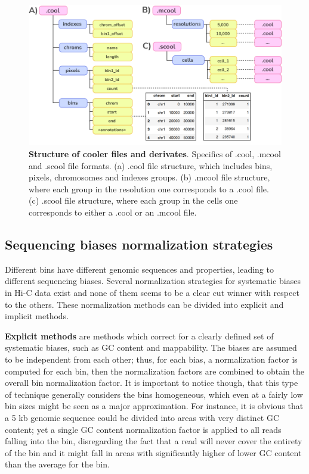 \begin{figure}
  \centering
  \includegraphics[width=1\textwidth]{cooler_format.png}
  \caption{\textbf{Structure of cooler files and derivates}. Specifics of .cool, .mcool and .scool file formats. (a) .cool file structure, which includes bins, pixels, chromosomes and indexes groups. (b) .mcool file structure, where each group in the resolution one corresponds to a .cool file. (c) .scool file structure, where each group in the cells one corresponds to either a .cool or an .mcool file.}
  \label{fig:cooler}
\end{figure}

\subsection{Sequencing biases normalization strategies}\label{par:sequencingbias}

Different bins have different genomic sequences and properties, leading to different sequencing biases. Several normalization strategies for systematic biases in Hi-C data exist and none of them seems to be a clear cut winner with respect to the others\cite{normalization2020}. These normalization methods can be divided into explicit and implicit methods. 

\textbf{Explicit methods} are methods which correct for a clearly defined set of systematic biases, such as GC content and mappability. The biases are assumed to be independent from each other; thus, for each bias, a normalization factor is computed for each bin, then the normalization factors are combined to obtain the overall bin normalization factor. It is important to notice though, that this type of technique generally considers the bins homogeneous, which even at a fairly low bin sizes might be seen as a major approximation. For instance, it is obvious that a 5 kb genomic sequence could be divided into areas with very distinct GC content; yet a single GC content normalization factor is applied to all reads falling into the bin, disregarding the fact that a read will never cover the entirety of the bin and it might fall in areas with significantly higher of lower GC content than the average for the bin.

